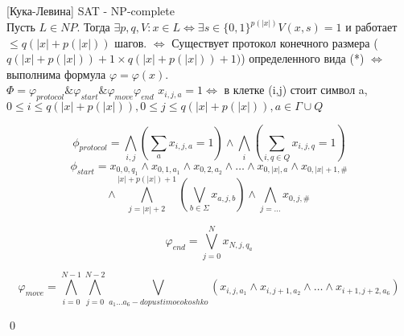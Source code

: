 	\begin{theorem}{[Кука-Левина]}
		SAT - NP-complete
		\proof \\
		Пусть $L \in NP$. Тогда $\exists p,q,V: x \in L \Leftrightarrow \exists s \in \{0,1\}^{p(|x|)}  V(x,s)=1$ и работает  $\le q(|x| + p(|x|))$ шагов.
		$ \Leftrightarrow$ Существует протокол конечного размера ($q(|x| + p(|x|)) + 1 \times q(|x| + p(|x|)) + 1)$) определенного вида (*)
		$\Leftrightarrow$ выполнима формула $\varphi = \varphi(x)$.\\
		
		$\Phi = \varphi_{protocol} \& \varphi_{start} \& \varphi_{move} \varphi_{end}$
		$x_{i,j,a} = 1 \Leftrightarrow$ в клетке (i,j) стоит символ a,\\
		$0 \le i \le q(|x| + p(|x|)), 0 \le j \le q(|x| + p(|x|)), a \in \Gamma \cup Q$
		
		$$\phi_{protocol} = \bigwedge_{i,j} (\sum_a x_{i,j,a} = 1) \wedge \bigwedge_i (\sum_{i,q \in Q}x_{i,j,q} = 1)$$
		$$\phi_{start}=x_{0,0,q_1} \wedge x_{0,1,a_1} \wedge x_{0,2,a_2} \wedge \ldots \wedge x_{0, |x|, a} \wedge x_{0,|x| + 1, \#}$$
		$$\wedge \bigwedge_{j=|x| + 2}^{|x| + p(|x|) + 1}(\bigvee_{b \in \Sigma} x_{a,j,b}) \wedge \bigwedge_{j=\ldots}x_{0,j,\#}$$
		
		$$\varphi_{end} = \bigvee_{j=0}^N x_{N,j,q_a}$$
		
		$$\varphi_{move} = \bigwedge_{i=0}^{N-1}\bigwedge_{j=0}^{N-2}\bigvee_{a_1 \ldots a_6 - dopustimoe okoshko} (x_{i,j,a_1} \wedge x_{i,j+1,a_2} \wedge \ldots \wedge x_{i+1, j+2, a_6})$$
	\end{theorem}
	\qed